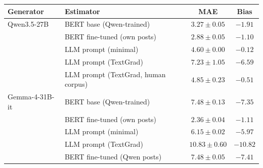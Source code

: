 \begin{tabular}{llcc}
\toprule
Generator & Estimator & MAE & Bias \\
\midrule
Qwen3.5-27B & BERT base (Qwen-trained) & $3.27 \pm 0.05$ & $-1.91$ \\
 & BERT fine-tuned (own posts) & $2.88 \pm 0.05$ & $-1.10$ \\
 & LLM prompt (minimal) & $4.60 \pm 0.00$ & $-0.12$ \\
 & LLM prompt (TextGrad) & $7.23 \pm 1.05$ & $-6.59$ \\
 & LLM prompt (TextGrad, human corpus) & $4.85 \pm 0.23$ & $-0.51$ \\
\midrule
Gemma-4-31B-it & BERT base (Qwen-trained) & $7.48 \pm 0.13$ & $-7.35$ \\
 & BERT fine-tuned (own posts) & $2.36 \pm 0.04$ & $-1.11$ \\
 & LLM prompt (minimal) & $6.15 \pm 0.02$ & $-5.97$ \\
 & LLM prompt (TextGrad) & $10.83 \pm 0.60$ & $-10.82$ \\
 & BERT fine-tuned (Qwen posts) & $7.48 \pm 0.05$ & $-7.41$ \\
\bottomrule
\end{tabular}
